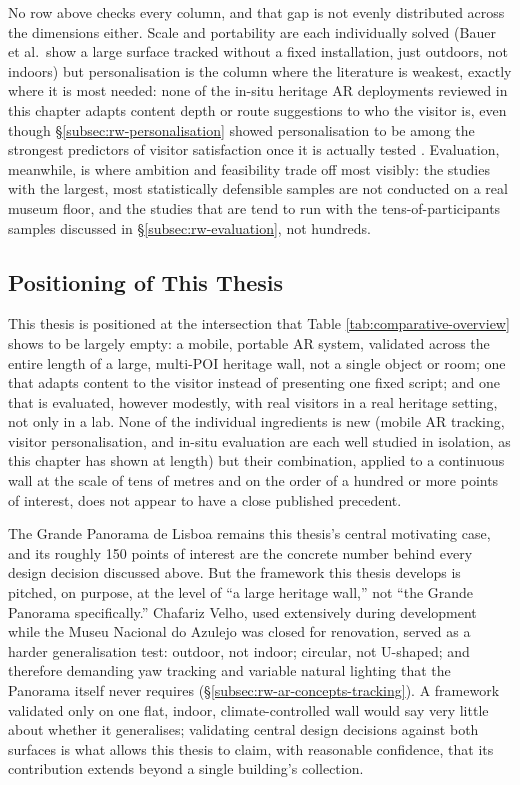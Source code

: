 No row above checks every column, and that gap is not evenly distributed
across the dimensions either. Scale and portability are each individually
solved (Bauer et al.\ show a large surface tracked without a fixed installation, just outdoors, not indoors) but personalisation is the
column where the literature is weakest, exactly where it is most needed:
none of the in-situ heritage AR deployments reviewed in this chapter
adapts content depth or route suggestions to who the visitor is, even
though \S\ref{subsec:rw-personalisation} showed personalisation to be among
the strongest predictors of visitor satisfaction once it is actually tested
\cite{hewang2025}. Evaluation, meanwhile, is where ambition and feasibility
trade off most visibly: the studies with the largest, most statistically
defensible samples \cite{hewang2025} are not conducted on a real museum
floor, and the studies that are tend to run with the tens-of-participants
samples discussed in \S\ref{subsec:rw-evaluation}, not hundreds.

\subsection{Positioning of This Thesis}
\label{subsec:rw-positioning}

This thesis is positioned at the intersection that Table
\ref{tab:comparative-overview} shows to be largely empty: a mobile,
portable AR system, validated across the entire length of a large,
multi-POI heritage wall, not a single object or room; one that adapts
content to the visitor instead of presenting one fixed script; and one that
is evaluated, however modestly, with real visitors in a real heritage
setting, not only in a lab. None of the individual ingredients is
new (mobile AR tracking, visitor personalisation, and in-situ evaluation are each well studied in isolation, as this chapter has shown at length)
but their combination, applied to a continuous wall at the scale of tens
of metres and on the order of a hundred or more points of interest, does
not appear to have a close published precedent.

The Grande Panorama de Lisboa remains this thesis's central motivating
case, and its roughly 150 points of interest are the concrete number
behind every design decision discussed above. But the framework this
thesis develops is pitched, on purpose, at the level of ``a large
heritage wall,'' not ``the Grande Panorama specifically.'' Chafariz Velho,
used extensively during development while the Museu Nacional do Azulejo
was closed for renovation, served as a harder generalisation test: outdoor, not indoor; circular,
not U-shaped; and therefore demanding yaw tracking and variable natural lighting that the Panorama
itself never requires (\S\ref{subsec:rw-ar-concepts-tracking}). A framework
validated only on one flat, indoor, climate-controlled wall would say very
little about whether it generalises; validating central design decisions
against both surfaces is what allows this thesis to claim, with reasonable
confidence, that its contribution extends beyond a single building's
collection.

